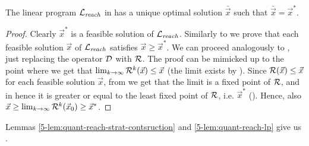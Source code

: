 \begin{lemma}
	\label{5-lem:quant-reach-lp}
	The linear program $\mathcal{L}_{\mathit{reach}}$ in  has a unique optimal solution 
	$\bar{\vec{x}}$ such that $\bar{\vec{x}} = \vec{x}^*$.
\end{lemma}
\begin{proof}
Clearly $\vec{x}^*$ is a feasible solution of $\mathcal{L}_{\mathit{reach}}$. Similarly to  we prove that each feasible solution $\vec{x}$ of $\mathcal{L}_{\mathit{reach}}$ satisfies $\vec{x}\geq \vec{x}^*$. We can proceed analogously  to , just replacing the operator $\mathcal{D}$ with $\mathcal{R}$. The proof can be mimicked up to the point where we get that $\lim_{k\rightarrow \infty} \mathcal{R}^k (\vec{x}) \leq \vec{x}$ (the limit exists by ). Since $\mathcal{R}(\vec{x})\leq \vec{x}$ for each feasible solution $\vec{x}$, from  we get that the limit is a fixed point of $\mathcal{R}$, and in hence it is greater or equal to the least fixed point of $\mathcal{R}$, i.e. $\vec{x}^*$ (). Hence, also $\vec{x} \geq \lim_{k\rightarrow \infty} \mathcal{R}^k (\vec{x}_0)\geq \vec{x}^*$. 
\end{proof}

\noindent
Lemmas \ref{5-lem:quant-reach-strat-contsruction} and \ref{5-lem:quant-reach-lp} give us .
